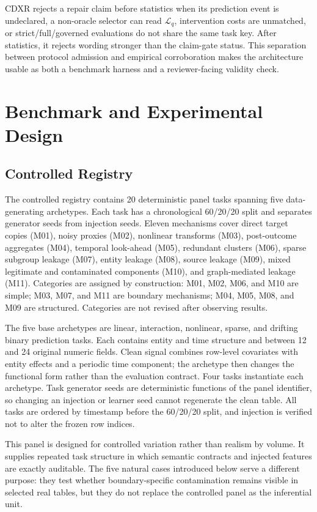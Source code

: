 \documentclass[sigconf,review]{acmart}
\begin{document}
CDXR rejects a repair claim before statistics when its prediction event is
undeclared, a non-oracle selector can read $\mathcal{L}_q$, intervention costs
are unmatched, or strict/full/governed evaluations do not share the same task
key. After statistics, it rejects wording stronger than the claim-gate status.
This separation between protocol admission and empirical corroboration makes
the architecture usable as both a benchmark harness and a reviewer-facing
validity check.

\section{Benchmark and Experimental Design}

\subsection{Controlled Registry}

The controlled registry contains 20 deterministic panel tasks spanning five
data-generating archetypes. Each task has a chronological 60/20/20 split and
separates generator seeds from injection seeds. Eleven mechanisms cover direct
target copies (M01), noisy proxies (M02), nonlinear transforms (M03),
post-outcome aggregates (M04), temporal look-ahead (M05), redundant clusters
(M06), sparse subgroup leakage (M07), entity leakage (M08), source leakage
(M09), mixed legitimate and contaminated components (M10), and graph-mediated
leakage (M11). Categories are assigned by construction: M01, M02, M06, and M10
are simple; M03, M07, and M11 are boundary mechanisms; M04, M05, M08, and M09
are structured. Categories are not revised after observing results.

The five base archetypes are linear, interaction, nonlinear, sparse, and
drifting binary prediction tasks. Each contains entity and time structure and
between 12 and 24 original numeric fields. Clean signal combines row-level
covariates with entity effects and a periodic time component; the archetype
then changes the functional form rather than the evaluation contract. Four
tasks instantiate each archetype. Task generator seeds are deterministic
functions of the panel identifier, so changing an injection or learner seed
cannot regenerate the clean table. All tasks are ordered by timestamp before
the 60/20/20 split, and injection is verified not to alter the frozen row
indices.

This panel is designed for controlled variation rather than realism by volume.
It supplies repeated task structure in which semantic contracts and injected
features are exactly auditable. The five natural cases introduced below serve
a different purpose: they test whether boundary-specific contamination remains
visible in selected real tables, but they do not replace the controlled panel
as the inferential unit.
\end{document}
